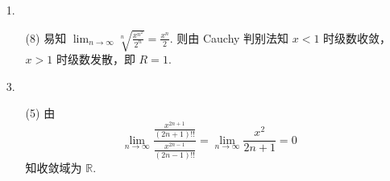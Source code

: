 \documentclass[11pt,oneside,fontset=fandol]{ctexbook} %
\begin{document}
\begin{enumerate}
    \item[1.]
    \begin{enumerate}
        \item[(8)]
        易知 $\lim_{n \to \infty} \sqrt[n]{\frac{x^{n^2}}{2^n}} = \frac {x^n} 2$. 则由 Cauchy 判别法知 $x < 1$ 时级数收敛，$x > 1$ 时级数发散，即 $R = 1$.
    \end{enumerate}
    \item[3.]
    \begin{enumerate}
        \item[(5)]
        由
        \[
            \lim_{n \to \infty} \frac{\frac{x^{2n+1}}{(2n+1)!!}}{\frac{x^{2n-1}}{(2n-1)!!}} = \lim_{n \to \infty} \frac{x^2}{2n+1} = 0
        \]
        知收敛域为 $\mathbb R$.
        

\end{enumerate}
\end{enumerate}
\end{document}
